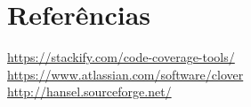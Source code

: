 \section{Referências}
\url{https://stackify.com/code-coverage-tools/} \\
\url{https://www.atlassian.com/software/clover} \\
\url{http://hansel.sourceforge.net/}
